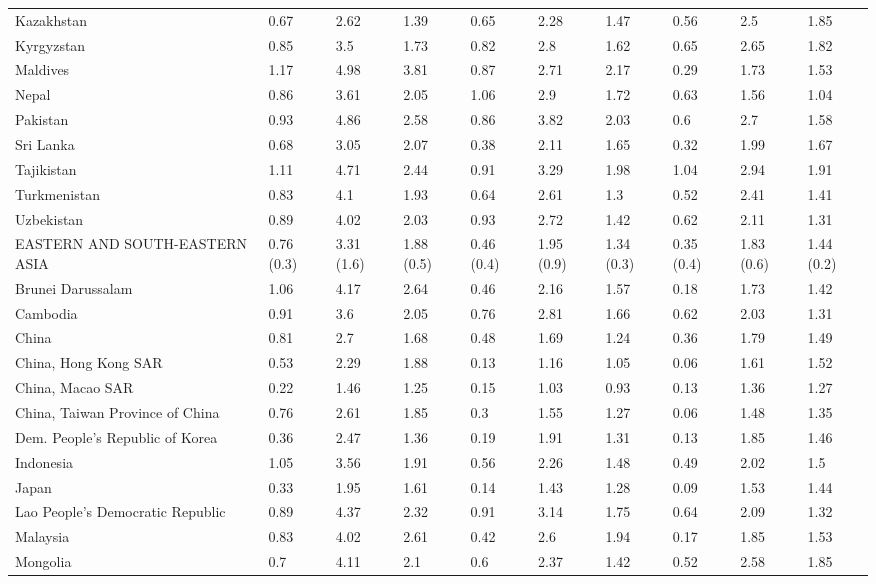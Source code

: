 \begin{longtable}[t]{llllllllll}
Kazakhstan & 0.67 & 2.62 & 1.39 & 0.65 & 2.28 & 1.47 & 0.56 & 2.5 & 1.85\\
Kyrgyzstan & 0.85 & 3.5 & 1.73 & 0.82 & 2.8 & 1.62 & 0.65 & 2.65 & 1.82\\
Maldives & 1.17 & 4.98 & 3.81 & 0.87 & 2.71 & 2.17 & 0.29 & 1.73 & 1.53\\
Nepal & 0.86 & 3.61 & 2.05 & 1.06 & 2.9 & 1.72 & 0.63 & 1.56 & 1.04\\
Pakistan & 0.93 & 4.86 & 2.58 & 0.86 & 3.82 & 2.03 & 0.6 & 2.7 & 1.58\\
Sri Lanka & 0.68 & 3.05 & 2.07 & 0.38 & 2.11 & 1.65 & 0.32 & 1.99 & 1.67\\
Tajikistan & 1.11 & 4.71 & 2.44 & 0.91 & 3.29 & 1.98 & 1.04 & 2.94 & 1.91\\
Turkmenistan & 0.83 & 4.1 & 1.93 & 0.64 & 2.61 & 1.3 & 0.52 & 2.41 & 1.41\\
Uzbekistan & 0.89 & 4.02 & 2.03 & 0.93 & 2.72 & 1.42 & 0.62 & 2.11 & 1.31\\
EASTERN AND SOUTH-EASTERN ASIA & 0.76 (0.3) & 3.31 (1.6) & 1.88 (0.5) & 0.46 (0.4) & 1.95 (0.9) & 1.34 (0.3) & 0.35 (0.4) & 1.83 (0.6) & 1.44 (0.2)\\
Brunei Darussalam & 1.06 & 4.17 & 2.64 & 0.46 & 2.16 & 1.57 & 0.18 & 1.73 & 1.42\\
Cambodia & 0.91 & 3.6 & 2.05 & 0.76 & 2.81 & 1.66 & 0.62 & 2.03 & 1.31\\
China & 0.81 & 2.7 & 1.68 & 0.48 & 1.69 & 1.24 & 0.36 & 1.79 & 1.49\\
China, Hong Kong SAR & 0.53 & 2.29 & 1.88 & 0.13 & 1.16 & 1.05 & 0.06 & 1.61 & 1.52\\
China, Macao SAR & 0.22 & 1.46 & 1.25 & 0.15 & 1.03 & 0.93 & 0.13 & 1.36 & 1.27\\
China, Taiwan Province of China & 0.76 & 2.61 & 1.85 & 0.3 & 1.55 & 1.27 & 0.06 & 1.48 & 1.35\\
Dem. People's Republic of Korea & 0.36 & 2.47 & 1.36 & 0.19 & 1.91 & 1.31 & 0.13 & 1.85 & 1.46\\
Indonesia & 1.05 & 3.56 & 1.91 & 0.56 & 2.26 & 1.48 & 0.49 & 2.02 & 1.5\\
Japan & 0.33 & 1.95 & 1.61 & 0.14 & 1.43 & 1.28 & 0.09 & 1.53 & 1.44\\
Lao People's Democratic Republic & 0.89 & 4.37 & 2.32 & 0.91 & 3.14 & 1.75 & 0.64 & 2.09 & 1.32\\
Malaysia & 0.83 & 4.02 & 2.61 & 0.42 & 2.6 & 1.94 & 0.17 & 1.85 & 1.53\\
Mongolia & 0.7 & 4.11 & 2.1 & 0.6 & 2.37 & 1.42 & 0.52 & 2.58 & 1.85\\

\end{longtable}
